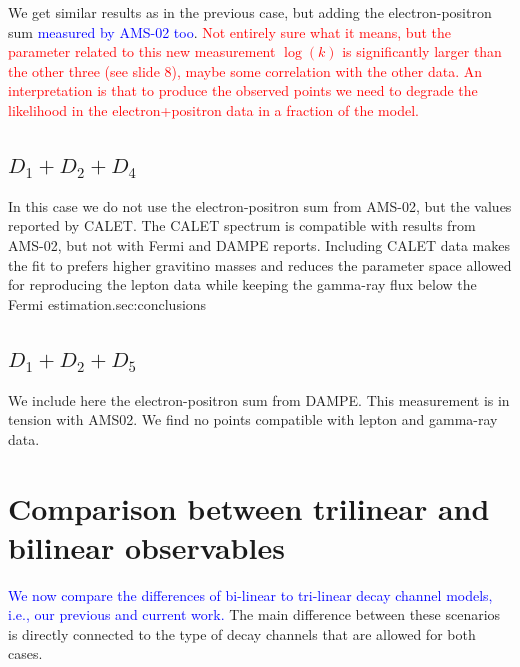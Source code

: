 \documentclass[a4paper,11pt]{article}
\newcommand*{\blue}{\textcolor{blue}}
\newcommand*{\red}{\textcolor{red}}
\begin{document}
We get similar results as in the previous case, but adding the electron-positron sum \blue{measured by AMS-02 too}. \red{Not entirely sure what it means, but the parameter related to this new measurement $\log(k)$ is significantly larger than the other three (see slide 8), maybe some correlation with the other data. An interpretation is that to produce the observed points we need to degrade the likelihood in the electron+positron data in a fraction of the model.}

\subsection{$D_1 + D_2 + D_4$}

In this case we do not use the electron-positron sum from AMS-02, but the values reported by CALET. The CALET spectrum is compatible with results from AMS-02, but not with Fermi and DAMPE reports. Including CALET data makes the fit to prefers higher gravitino masses and reduces the parameter space allowed for reproducing the lepton data while keeping the gamma-ray flux below the Fermi estimation.sec:conclusions


\subsection{$D_1 + D_2 + D_5$}
We include here the electron-positron sum from DAMPE. This measurement is in tension with AMS02. We find no points compatible with lepton and gamma-ray data.

\section{Comparison between trilinear and bilinear observables}
\label{sec:comparison}

\blue{We now compare the differences of bi-linear to tri-linear decay channel models, i.e., our previous and current work.} The main difference between these scenarios is directly connected to the type of decay channels that are allowed for both cases. 

\end{document}
